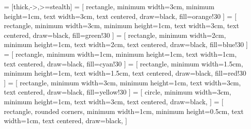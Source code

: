  = [thick,->,>=stealth]
     = [
        rectangle,
        minimum width=3cm,
        minimum height=1cm,
        text width=3cm,
        text centered,
        draw=black,
        fill=orange!30
    ]
     = [
        rectangle,
        minimum width=3cm,
        minimum height=1cm,
        text width=3cm,
        text centered,
        draw=black,
        fill=green!30
    ]
     = [
        rectangle,
        minimum width=2cm,
        minimum height=1cm,
        text width=2cm,
        text centered,
        draw=black,
        fill=blue!30
    ]
     = [
        rectangle,
        minimum width=1cm,
        minimum height=1cm,
        text width=1cm,
        text centered,
        draw=black,
        fill=cyan!30
    ]
     = [
        rectangle,
        minimum width=1.5cm,
        minimum height=1cm,
        text width=1.5cm,
        text centered,
        draw=black,
        fill=red!30
    ]
     = [
        rectangle,
        minimum width=3cm,
        minimum height=1cm,
        text width=3cm,
        text centered,
        draw=black,
        fill=yellow!30
    ]
     = [
        circle,
        minimum width=3cm,
        minimum height=1cm,
        text width=3cm,
        text centered,
        draw=black,
    ]
     = [
        rectangle,
        rounded corners,
        minimum width=1cm,
        minimum height=0.5cm,
        text width=1cm,
        text centered,
        draw=black,
    ]


